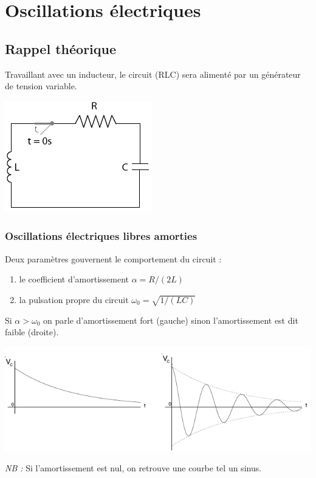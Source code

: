 \documentclass	[11pt, a4paper, openany]{book}
\begin{document}
\newpage
\section{Oscillations électriques}
\subsection{Rappel théorique}
Travaillant avec un inducteur, le circuit (RLC) sera alimenté par un générateur de tension variable.
\begin{center}
\includegraphics[scale=0.1]{labo/image29.png}
\end{center}
\subsubsection*{Oscillations électriques libres amorties}
Deux paramètres gouvernent le comportement du circuit : 
\begin{enumerate}
\item le coefficient d'amortissement $\alpha = R/(2L)$
\item la pulsation propre du circuit $\omega_0 = \sqrt{1/(LC)}$
\end{enumerate}
Si $\alpha > \omega_0$ on parle d'amortissement fort (gauche) sinon l'amortissement est dit faible (droite).
\begin{center}
\includegraphics[scale=0.5]{labo/image30.png}
\end{center}
\textit{NB :} Si l'amortissement est nul, on retrouve une courbe tel un sinus.
\end{document}
